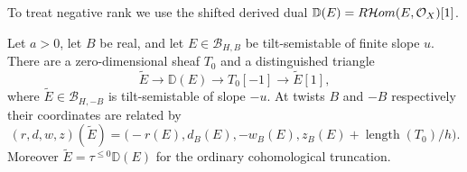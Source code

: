To treat negative rank we use the shifted derived dual
$\mathbb D(E)=R\mathcal Hom(E,\mathcal O_X)[1]$.

\begin{lemma}\label{lem:tilt-duality}
Let $a>0$, let $B$ be real, and let $E\in\mathcal B_{H,B}$
be tilt-semistable of finite slope $u$.  There are a zero-dimensional
sheaf $T_0$ and a distinguished triangle
\begin{equation}\label{eq:tilt-dual-triangle}
 \widetilde E\longrightarrow\mathbb D(E)\longrightarrow T_0[-1]
 \longrightarrow\widetilde E[1],
\end{equation}
where $\widetilde E\in\mathcal B_{H,-B}$ is tilt-semistable of
slope $-u$.  At twists $B$ and $-B$ respectively their coordinates
are related by
\begin{equation}\label{eq:tilt-dual-characters}
 (r,d,w,z)(\widetilde E)
   =\bigl(-r(E),d_B(E),-w_B(E),z_B(E)+\operatorname{length}(T_0)/h\bigr).
\end{equation}
Moreover $\widetilde E=\tau^{\le0}\mathbb D(E)$ for the ordinary
cohomological truncation.
\end{lemma}

